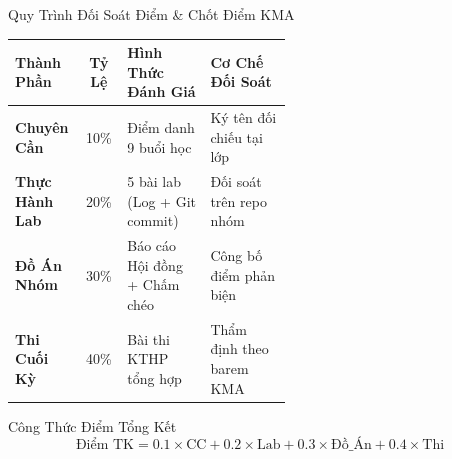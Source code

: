 \begin{frame}{Quy Trình Đối Soát Điểm \& Chốt Điểm KMA}
  \begin{table}[h]
    \centering\scriptsize
    \begin{tabularx}{\linewidth}{@{}p{0.25\linewidth} c p{0.30\linewidth} X@{}}
      \toprule
      \textbf{Thành Phần} & \textbf{Tỷ Lệ} & \textbf{Hình Thức Đánh Giá} & \textbf{Cơ Chế Đối Soát} \\
      \midrule
      \textbf{Chuyên Cần} & 10\% & Điểm danh 9 buổi học & Ký tên đối chiếu tại lớp \\
      \textbf{Thực Hành Lab} & 20\% & 5 bài lab (Log + Git commit) & Đối soát trên repo nhóm \\
      \textbf{Đồ Án Nhóm} & 30\% & Báo cáo Hội đồng + Chấm chéo & Công bố điểm phản biện \\
      \textbf{Thi Cuối Kỳ} & 40\% & Bài thi KTHP tổng hợp & Thẩm định theo barem KMA \\
      \bottomrule
    \end{tabularx}
  \end{table}

  \begin{block}{Công Thức Điểm Tổng Kết}
    $$\text{Điểm TK} = 0.1 \times \text{CC} + 0.2 \times \text{Lab} + 0.3 \times \text{Đồ\_Án} + 0.4 \times \text{Thi}$$
  \end{block}
\end{frame}

